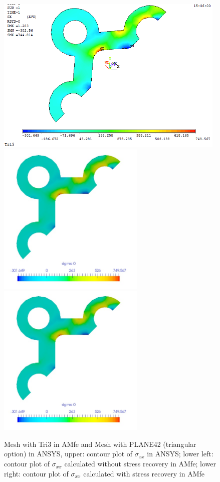 \begin{figure}[htbp]
	\begin{center}
		\includegraphics[width=11cm,clip]{TTri3_Sxx.png} 	
		\includegraphics[width=7cm,clip]{TTri3_Sxx_PD.png} 		
		\includegraphics[width=7cm,clip]{TTri3_Sxx_P.png} 		
		\caption{Mesh with Tri3 in AMfe and Mesh with PLANE42 (triangular option) in ANSYS, upper: contour plot of $\sigma_{xx}$ in ANSYS; lower left: contour plot of $\sigma_{xx}$ calculated without stress recovery in AMfe; lower right: contour plot of $\sigma_{xx}$ calculated with stress recovery in AMfe} \label{fig: Tri3_Sxx}
	\end{center}
\end{figure}
\clearpage 

